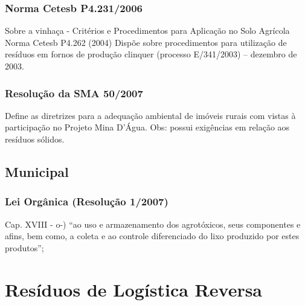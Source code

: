 \begin{subapend}
\begin{subsubapend}
		\subsubsection{Norma Cetesb P4.231/2006}
		Sobre a vinhaça - Critérios e Procedimentos para Aplicação no Solo Agrícola Norma Cetesb P4.262 (2004) Dispõe sobre procedimentos para utilização de resíduos em fornos de produção clinquer (processo E/341/2003) – dezembro de 2003.
		\subsubsection{Resolução da SMA 50/2007}
		Define as diretrizes para a adequação ambiental de imóveis rurais com vistas à participação no Projeto Mina D’Água. Obs: possui exigências em relação aos resíduos sólidos.
	\end{subsubapend}
\end{subapend}

\begin{subapend}
\subsection{Municipal}	
	\begin{subsubapend}
		\item \subsubsection{Lei Orgânica (Resolução 1/2007)}
		Cap. XVIII - o-) “ao uso e armazenamento dos agrotóxicos, seus componentes e afins, bem como, a coleta e ao controle diferenciado do lixo produzido por estes produtos”;   
	\end{subsubapend}
\end{subapend}

\section{Resíduos de Logística Reversa}

